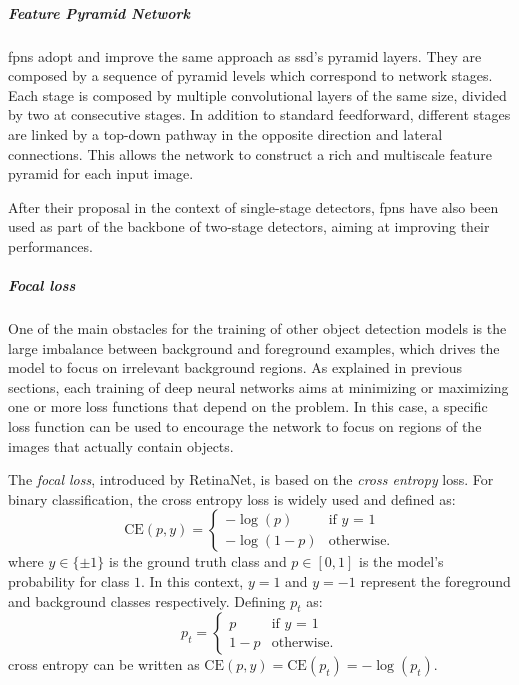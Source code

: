 \documentclass[%
    corpo=12pt,
    twoside,
    stile=classica,   
    tipotesi=magistrale,
    evenboxes,
    english,
	numerazioneromana,
]{toptesi}
\begin{document}
\subparagraph{Feature Pyramid Network}
\glspl{fpn}\cite{lin2017feature} adopt and improve the same approach as \acrshort{ssd}'s pyramid layers. They are composed by a sequence of pyramid levels which correspond to network stages. Each stage is composed by multiple convolutional layers of the same size, divided by two at consecutive stages. In addition to standard feedforward, different stages are linked by a top-down pathway in the opposite direction and lateral connections. This allows the network to construct a rich and multiscale feature pyramid for each input image.

After their proposal in the context of single-stage detectors, \glspl{fpn} have also been used as part of the backbone of two-stage detectors, aiming at improving their performances.

\subparagraph{Focal loss}
One of the main obstacles for the training of other object detection models is the large imbalance between background and foreground examples, which drives the model to focus on irrelevant background regions.
As explained in previous sections, each training of deep neural networks aims at minimizing or maximizing one or more loss functions that depend on the problem.
In this case, a specific loss function can be used to encourage the network to focus on regions of the images that actually contain objects.

\bigskip
The \textit{focal loss}, introduced by RetinaNet, is based on the \textit{cross entropy} loss. For binary classification, the cross entropy loss is widely used and defined as:
\begin{equation}
	\text{CE}(p,y) = \begin{cases}
		-\log(p) & \text{if $y$ = 1}\\
		-\log(1-p) & \text{otherwise.}
	\end{cases}
\end{equation}
where $y\in \{\pm 1\}$ is the ground truth class and $p\in\left[0,1\right]$ is the model's probability for class $1$. In this context, $y=1$ and $y=-1$ represent the foreground and background classes respectively. Defining $p_t$ as:
\begin{equation}
	p_t = \begin{cases}
		p & \text{if $y$ = 1}\\
		1-p & \text{otherwise.}
	\end{cases}
\end{equation}
cross entropy can be written as $\text{CE}(p,y) = \text{CE}(p_t) = -\log(p_t)$.
\end{document}
